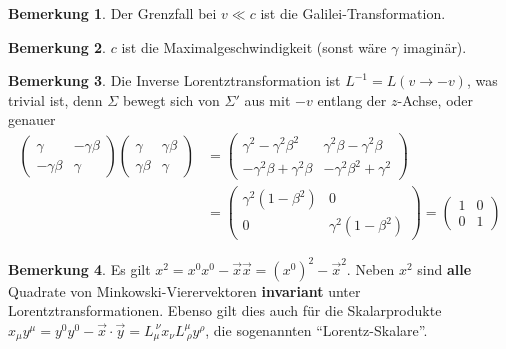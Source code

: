 \documentclass[oneside]{book}
\theoremstyle{definition}
\newtheorem*{bemerkung*}{Bemerkung}
\begin{document}
\begin{bemerkung*}
	Der Grenzfall bei $v \ll c$ ist die Galilei-Transformation.
\end{bemerkung*}
\begin{bemerkung*}
	 $c$ ist die Maximalgeschwindigkeit (sonst wäre $\gamma$ imaginär).
\end{bemerkung*}
\begin{bemerkung*}
	Die Inverse Lorentztransformation ist $L^{-1} = L(v \to -v)$, was trivial ist, denn $\Sigma$ bewegt sich von $\Sigma'$ aus mit $-v$ entlang der $z$-Achse, oder genauer
	\begin{align*}
	\begin{pmatrix}
	\gamma & -\gamma \beta\\
	-\gamma \beta & \gamma
	\end{pmatrix}
	\begin{pmatrix}
	\gamma & \gamma \beta\\
	\gamma \beta & \gamma
	\end{pmatrix}
	&= 	\begin{pmatrix}
	\gamma^2 - \gamma^2 \beta^2& \gamma^2 \beta -\gamma^2 \beta\\
	-\gamma^2 \beta + \gamma^2 \beta & -\gamma^2 \beta^2 + \gamma^2
	\end{pmatrix}\\
	&= \begin{pmatrix}
	\gamma^2(1 - \beta^2)& 0\\
	0 & \gamma^2(1 - \beta^2)
	\end{pmatrix}
	= \begin{pmatrix}
	1 & 0 \\ 0 & 1
	\end{pmatrix}
	\end{align*}
\end{bemerkung*}
\begin{bemerkung*} Es gilt $x^2 = x^0 x^0 - \vec{x} \vec{x} = (x^0)^2 - \vec{x}^2$. Neben $x^2$ sind \textbf{alle} Quadrate von Minkowski-Vierervektoren \textbf{invariant} unter Lorentztransformationen. Ebenso gilt dies auch für die Skalarprodukte $x_\mu y^\mu = y^0 y^0 - \vec{x}\cdot\vec{y} = L_{\mu}^{~\nu} x_\nu  L^{\mu}_{~\rho}y^\rho$, die sogenannten "`Lorentz-Skalare"'.
\end{bemerkung*}
\end{document}
